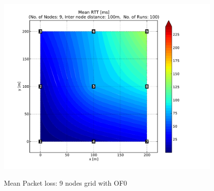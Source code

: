 \begin{figure}[htbp]
{      \includegraphics[scale=0.23]{Pics/results/9/OF0/grid/dist100_montecarlo_contour.pdf}}
  \caption{Mean Packet loss: 9 nodes grid with OF0}
 \label{fig:rtt_9_grid_of0}
\end{figure}


